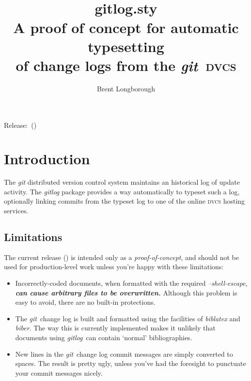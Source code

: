 \documentclass[a4paper,12pt,twoside,openany]{memoir}
\newcommand{\sfit}[1]{\textit{#1}}
\newcommand{\git}{\sfit{git}}
\newcommand{\tpname}{\sfit{gitlog}}
\newcommand{\tpfname}{\textsf{gitlog.sty}}
\begin{document}
\frontmatter
\title{%
	~\\[2\baselineskip]
	\Huge \tpfname\\[2ex]%
	\Large A proof of concept for automatic typesetting \\of change logs from the \git\ \textsc{dvcs}
	}
\author{Brent Longborough}
\date{ }
\maketitle

{\centering
Release:\gitRels\ (\gitAbbrevHash)\\
}
\thispagestyle{empty}
\clearforchapter
\tableofcontents*
\mainmatter
\pagestyle{giruled}
\chapter{Introduction}
The \git{} distributed version control system
maintains an historical log of update activity.
The \tpname{} package provides a way automatically 
to typeset such a log, optionally linking commits 
from the typeset log
to one of the online \textsc{dvcs} hosting services.

\section{Limitations}

The current release (\gitRel) 
is intended only as a \emph{proof-of-concept}, 
and should not be used for production-level work
unless you're happy with these limitations:
\begin{itemize}
\item Incorrectly-coded documents, when formatted with the
required \sfit{--shell-escape}, 
\textbf{\emph{can cause arbitrary files to be overwritten.}} 
Although this problem is easy to avoid,
there are no built-in protections.
\item The \git\ change log is built and formatted using the 
facilities of \sfit{biblatex} and \sfit{biber}.
The way this is currently implemented makes it unlikely that 
documents using \tpname\ can contain `normal' bibliographies.
\item New lines in the \git\ change log commit messages are 
simply converted to spaces. 
The result is pretty ugly, 
unless you've had the foresight 
to punctuate your commit messages nicely.
\end{itemize}
\end{document}
